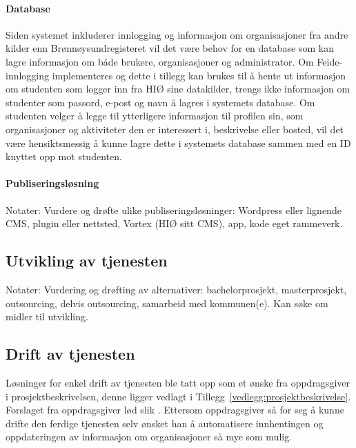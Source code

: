 \paragraph{Database}
Siden systemet inkluderer innlogging og informasjon om organisasjoner fra andre kilder enn Brønnøysundregisteret vil det være behov for en database som kan lagre informasjon om både brukere, organisasjoner og administrator. Om Feide-innlogging implementeres og dette i tillegg kan brukes til å hente ut informasjon om studenten som logger inn fra HIØ sine datakilder, trengs ikke informasjon om studenter som passord, e-post og navn å lagres i systemets database. Om studenten velger å legge til ytterligere informasjon til profilen sin, som organisasjoner og aktiviteter den er interessert i, beskrivelse eller bosted, vil det være hensiktsmessig å kunne lagre dette i systemets database sammen med en ID knyttet opp mot studenten.

\paragraph{Publiseringsløsning}
Notater:
Vurdere og drøfte ulike publiseringsløsninger: Wordpress eller lignende CMS, plugin eller nettsted, Vortex (HIØ sitt CMS), app, kode eget rammeverk.

\subsection{Utvikling av tjenesten}
Notater:
Vurdering og drøfting av alternativer: bachelorprosjekt, masterprosjekt, outsourcing, delvis outsourcing, samarbeid med kommunen(e).
Kan søke om midler til utvikling.

\subsection{Drift av tjenesten}
Løsninger for enkel drift av tjenesten ble tatt opp som et ønske fra oppdragsgiver i prosjektbeskrivelsen, denne ligger vedlagt i Tillegg~\ref{vedlegg:prosjektbeskrivelse}. Forslaget fra oppdragsgiver lød slik  \cite{PROSJEKTBESKRIVELSE:22}. Ettersom oppdragsgiver så for seg å kunne drifte den ferdige tjenesten selv ønsket han å automatisere innhentingen og oppdateringen av informasjon om organisasjoner så mye som mulig. 

